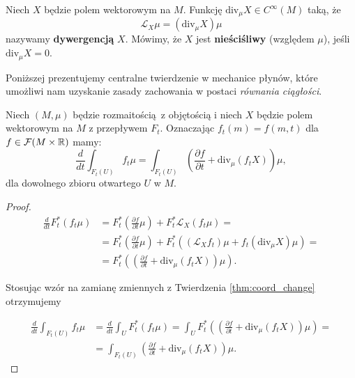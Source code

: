 Niech \(X\) będzie polem wektorowym na \(M\). Funkcję \(\mathrm{div}_\mu X \in C^\infty(M)\) taką, że
\begin{equation}
\mathcal{L}_X \mu = (\mathrm{div}_\mu X) \mu
\end{equation}
nazywamy \textbf{dywergencją} \(X\). Mówimy, że \(X\) jest \textbf{nieściśliwy} (względem \(\mu\)), jeśli \(\mathrm{div}_\mu X = 0\).

Poniższej prezentujemy centralne twierdzenie w mechanice płynów, które umożliwi nam uzyskanie zasady zachowania w postaci \emph{równania ciągłości}.
\begin{twierdzenie}\label{thm:transport}
    Niech \((M, \mu)\) będzie rozmaitością z objętością i niech \(X\) będzie polem wektorowym na \(M\) z przepływem \(F_t\). Oznaczając \(f_t(m) = f(m, t)\) dla \(f\in\mathcal{F}(M\times \mathbb{R})\) mamy:
\begin{equation}\label{eq:transport}
    \frac{d}{dt}\int_{F_t(U)} f_t \mu = \int_{F_t(U)}\left(\frac{\partial f}{\partial t} + \mathrm{div}_\mu (f_t X)\right) \mu,
\end{equation}
    dla dowolnego zbioru otwartego \(U\) w \(M\).
\end{twierdzenie}
\begin{proof}
    \begin{align*}
        \frac{d}{dt}F^\ast_t(f_t\mu) &= F^\ast_t\left(\frac{\partial f}{\partial t}\mu\right)+
        F^\ast_t\mathcal{L}_X(f_t\mu) =\\
        &= F^\ast_t\left(\frac{\partial f}{\partial t}\mu\right) +
        F^\ast_t\left(\left(\mathcal{L}_X f_t\right)\mu + f_t(\mathrm{div}_\mu X)\mu\right) =\\
        &= F^\ast_t\left(\left(\frac{\partial f}{\partial t}+\mathrm{div}_\mu(f_t X)\right)\mu\right).
    \end{align*}

    Stosując wzór na zamianę zmiennych z Twierdzenia \ref{thm:coord_change} otrzymujemy

    \begin{align*}
       \frac{d}{dt}\int_{F_t (U)} f_t \mu &= \frac{d}{dt}\int_U F^\ast_t (f_t \mu)
       = \int_U F^\ast_t \left(\left(\frac{\partial f}{\partial t} + \mathrm{div}_\mu (f_t X)\right)\mu\right) =\\
       &=\int_{F_t(U)} \left(\frac{\partial f}{\partial t} + \mathrm{div}_\mu (f_t X)\right)\mu.
    \end{align*}
\end{proof}

